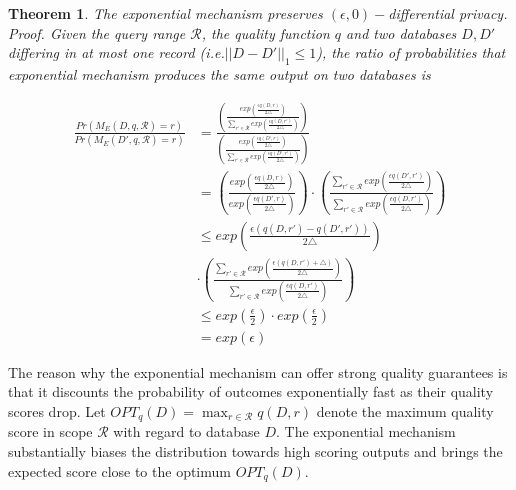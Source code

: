 \documentclass[a4paper, 11pt]{article} %
\makeatletter
\DeclareRobustCommand{\ie}{i.e.\@\xspace}
\newtheorem{theorem}{Theorem}
\makeatother
\begin{document}
\begin{theorem}
The exponential mechanism preserves $(\epsilon, 0)-$differential privacy.
\textit{Proof. Given the query range $\mathcal{R}$, the quality function $q$ and two databases $D, D'$ differing in at most one record (\ie $||D-D'||_1 \leq 1$), the ratio of probabilities that exponential mechanism produces the same output on two databases is }

\begin{align}
\frac{Pr(M_E(D, q, \mathcal{R})=r)}{Pr(M_E(D', q, \mathcal{R})=r)} &=
 \frac{
\left(
\frac{exp( \frac{\epsilon q(D,r) }{2 \triangle})}{\sum_{r' \in \mathcal{R}} exp( \frac{\epsilon q(D,r') }{2 \triangle})}
\right)
}
{
\left(
\frac{exp( \frac{\epsilon q(D',r) }{2 \triangle})}{\sum_{r' \in \mathcal{R}} exp( \frac{\epsilon q(D',r') }{2 \triangle})}
\right)
} \\
&=
\left(
\frac{exp( \frac{\epsilon q(D,r) }{2 \triangle})}
{exp( \frac{\epsilon q(D',r) }{2 \triangle})}
\right)
\cdot
\left(
\frac{\sum_{r' \in \mathcal{R}} exp( \frac{\epsilon q(D',r') }{2 \triangle})}{\sum_{r' \in \mathcal{R}} exp( \frac{\epsilon q(D,r') }{2 \triangle})}
\right) \\
& \leq exp \left(
\frac{\epsilon (q(D, r') - q(D', r') )}{2 \triangle}
\right) \\
& \cdot
\left(
\frac{\sum_{r' \in \mathcal{R}} exp( \frac{\epsilon (q(D,r')+\triangle) }{2 \triangle})}
{\sum_{r' \in \mathcal{R}} exp( \frac{\epsilon q(D,r') }{2 \triangle})}
\right) \\
& \leq exp(\frac{\epsilon}{2}) \cdot exp(\frac{\epsilon}{2})
 \\
&= exp(\epsilon)
\end{align}
\end{theorem}


The reason why the exponential mechanism can offer strong quality guarantees is that it discounts the probability of outcomes exponentially fast as their quality scores drop. Let $OPT_q(D) = \max_{r \in \mathcal{R}} q(D, r)$ denote the maximum quality score in scope $\mathcal{R}$ with regard to database $D$. The exponential mechanism substantially biases the distribution towards high scoring outputs and brings the expected score close to the optimum $OPT_q(D)$.
\end{document}
